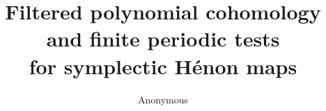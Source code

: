 \documentclass[11pt,letterpaper]{article}
\title{Filtered polynomial cohomology and finite periodic tests\\
for symplectic H\'enon maps}
\author{Anonymous}
\date{}
\theoremstyle{definition}
\theoremstyle{remark}
\begin{document}
\maketitle
\begin{abstract}

\end{abstract}








\label{main-body-end}
\clearpage
\label{references-start}


\end{document}
